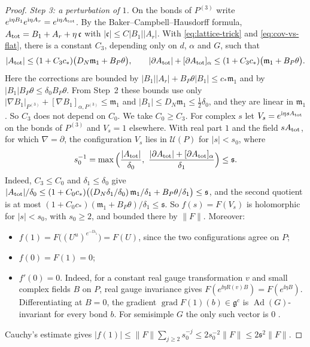\begin{proof}
\emph{Step 3: a perturbation of $1$.} On the bonds of $P^{(3)}$ write $e^{\mathrm i\eta B_1}e^{\mathrm i\eta A_r}=e^{\mathrm i\eta A_{\rm tot}}$. By the Baker--Campbell--Hausdorff formula, $A_{\rm tot}=B_1+A_r+\eta\,\mathfrak c$ with $|\mathfrak c|\le C|B_1||A_r|$. With \eqref{eq:lattice-trick} and \eqref{eq:cov-vs-flat}, there is a constant $C_3$, depending only on $d$, $\alpha$ and $G$, such that
\[
|A_{\rm tot}|\le(1+C_3c_*)\big(D_N\mathfrak m_1+B_P\theta\big),\qquad|\partial A_{\rm tot}|+[\partial A_{\rm tot}]_\alpha\le(1+C_3c_*)\big(\mathfrak m_1+B_P\theta\big).
\]
Here the corrections are bounded by $|B_1||A_r|+B_P\theta|B_1|\le c_*\mathfrak m_1$ and by $|B_1|B_P\theta\le\delta_0B_P\theta$. From Step~2 these bounds use only $|\nabla B_1|_{P^{(3)}}+[\nabla B_1]_{\alpha,P^{(3)}}\le\mathfrak m_1$ and $|B_1|\le D_N\mathfrak m_1\le\frac12\delta_0$, and they are linear in $\mathfrak m_1$. So $C_3$ does not depend on $C_0$. We take $C_0\ge C_3$.
For complex $s$ let $V_s=e^{\mathrm i\eta sA_{\rm tot}}$ on the bonds of $P^{(3)}$ and $V_s=1$ elsewhere. With real part $1$ and the field $sA_{\rm tot}$, for which $\nabla=\partial$, the configuration $V_s$ lies in $\mathcal U(P)$ for $|s|<s_0$, where
\[
s_0^{-1}=\max\Big(\frac{|A_{\rm tot}|}{\delta_0},\ \frac{|\partial A_{\rm tot}|+[\partial A_{\rm tot}]_\alpha}{\delta_1}\Big)\le\mathfrak s .
\]
Indeed, $C_3\le C_0$ and $\delta_1\le\delta_0$ give $|A_{\rm tot}|/\delta_0\le(1+C_0c_*)\big((D_N\delta_1/\delta_0)\,\mathfrak m_1/\delta_1+B_P\theta/\delta_1\big)\le\mathfrak s$, and the second quotient is at most $(1+C_0c_*)(\mathfrak m_1+B_P\theta)/\delta_1\le\mathfrak s$. So $f(s)=F(V_s)$ is holomorphic for $|s|<s_0$, with $s_0\ge2$, and bounded there by $\|F\|$. Moreover:
\begin{itemize}
\item $f(1)=F\big((U^u)^{e^{-\ii\lambda_1}}\big)=F(U)$, since the two configurations agree on $P$;
\item $f(0)=F(1)=0$;
\item $f'(0)=0$. Indeed, for a constant real gauge transformation $v$ and small complex fields $B$ on $P$, real gauge invariance gives $F(e^{\ii\eta R(v)B})=F(e^{\ii\eta B})$. Differentiating at $B=0$, the gradient $\operatorname{grad}F(1)(b)\in\mathfrak g^c$ is $\operatorname{Ad}(G)$-invariant for every bond $b$. For semisimple $G$ the only such vector is $0$ \cite[(31)--(32)]{BalUV3}.
\end{itemize}
Cauchy's estimate gives $|f(1)|\le\|F\|\sum_{j\ge2}s_0^{-j}\le2s_0^{-2}\|F\|\le2\mathfrak s^2\|F\|$.


\end{proof}
